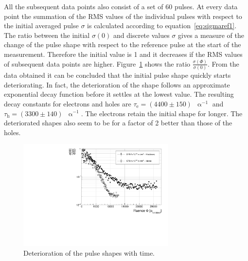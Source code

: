 All the subsequent data points also consist of a set of 60 pulses. At every data point the summation of the RMS values of the individual pulses with respect to the initial averaged pulse $\sigma$ is calculated according to equation~\ref{eq:sigmaref1}. The ratio between the initial $\sigma (0)$ and discrete values $\sigma$ gives a measure of the change of the pulse shape with respect to the reference pulse at the start of the measurement. Therefore the initial value is 1 and it decreases if the RMS values of subsequent data points are higher.
Figure~\ref{fig:longtermc2corr} shows the ratio $\frac{\sigma(\Phi)}{\sigma (0) }$. From the data obtained it can be concluded that the initial pulse shape quickly starts deteriorating. In fact, the deterioration of the shape follows an approximate exponential decay function before it settles at the lowest value. The resulting decay constants for electrons and holes are $\tau_{\mathrm{e}}=(4400\pm150)$~$\upalpha^{-1}$ and $\tau_{\mathrm{h}}=(3300\pm140)$~$\upalpha^{-1}$. The electrons retain the initial shape for longer. The deteriorated shapes also seem to be for a factor of 2 better than those of the holes. 

\begin{figure}[!t]
\begin{center}
\includegraphics[width=0.7\textwidth]{03_measurement_results/scripts/plots/plotLifetime/corrlifetime}
\caption{Deterioration of the pulse shapes with time.}
\label{fig:longtermc2corr}
\end{center}
\end{figure}


